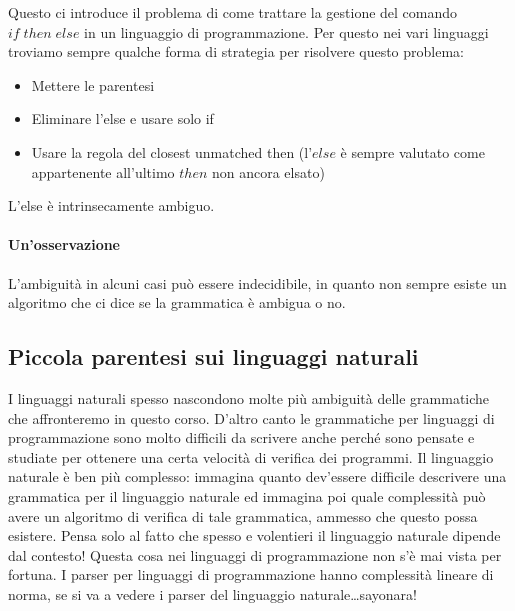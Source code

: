 \documentclass[class=book, crop=false, oneside, 12pt]{standalone}
\begin{document}
Questo ci introduce il problema di come trattare la gestione del comando \(if \; then \; else\) in un linguaggio di programmazione.
Per questo nei vari linguaggi troviamo sempre qualche forma di strategia per risolvere questo problema:
\begin{itemize}
    \item Mettere le parentesi
    \item Eliminare l’else e usare solo if
    \item Usare la regola del closest unmatched then (l’\(else\) è sempre valutato come appartenente all’ultimo \(then\) non ancora elsato)
\end{itemize}
L’else è intrinsecamente ambiguo.

\paragraph{Un'osservazione}
L’ambiguità in alcuni casi può essere indecidibile, in quanto non sempre esiste un algoritmo che ci dice se la grammatica è ambigua o no.

\subsection{Piccola parentesi sui linguaggi naturali}
I linguaggi naturali spesso nascondono molte più ambiguità delle grammatiche che affronteremo in questo corso. D'altro canto le grammatiche per linguaggi di programmazione sono molto difficili da scrivere anche perché sono pensate e studiate per ottenere una certa velocità di verifica dei programmi. Il linguaggio naturale è ben più complesso: immagina quanto dev’essere difficile descrivere una grammatica per il linguaggio naturale ed immagina poi quale complessità può avere un algoritmo di verifica di tale grammatica, ammesso che questo possa esistere. Pensa solo al fatto che spesso e volentieri il linguaggio naturale dipende dal contesto! Questa cosa nei linguaggi di programmazione non s’è mai vista per fortuna. I parser per linguaggi di programmazione hanno complessità lineare di norma, se si va a vedere i parser del linguaggio naturale\dots  sayonara!
\end{document}
